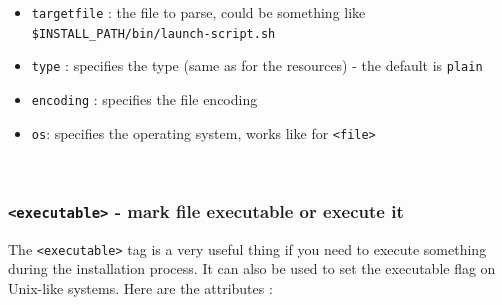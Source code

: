 \begin{itemize}

  \item \texttt{targetfile} : the file to parse, could be something like\\
  \texttt{\$INSTALL\_PATH/bin/launch-script.sh}

  \item \texttt{type} : specifies the type (same as for the resources) -
  the default is \texttt{plain}

  \item \texttt{encoding} : specifies the file encoding

  \item \texttt{os}: specifies the operating system, works like for
  \texttt{<file>}

\end{itemize}\

\subsubsection{\texttt{<executable>} - mark file executable or execute it}

The \texttt{<executable>} tag is a very useful thing if you need to execute
something during the installation process. It can also be used to set the
executable flag on Unix-like systems. Here are the attributes :

